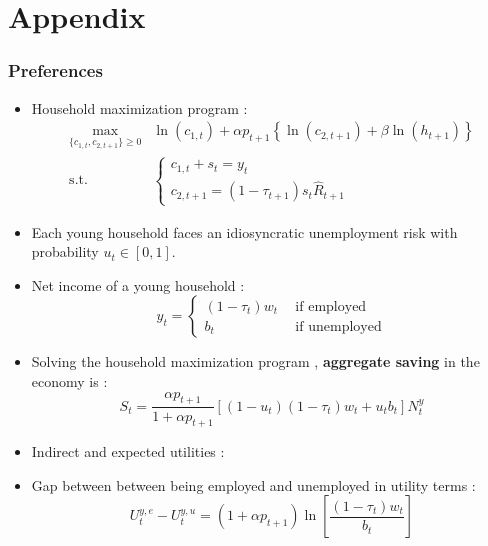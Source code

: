 \documentclass{beamer}
\begin{document}
	\section*{Appendix}
		\begin{frame}[label = preferences]\frametitle{Preferences}
			\begin{itemize}
				\item Household maximization program :
				\begin{align*}
					\max_{\lbrace c_{1,t}, c_{2,t+1} \rbrace \geq 0} &\ln(c_{1,t}) + \alpha p_{t+1}\left\lbrace \ln(c_{2,t+1}) + \beta \ln(h_{t+1}) \right\rbrace\\
					\text{s.t.} ~~ & \begin{cases}
					c_{1,t} + s_t = y_t \\
					c_{2,t+1} = (1-\tau_{t+1}) s_t \hat{R}_{t+1}
					\end{cases}
				\end{align*}
				\item Each young household faces an idiosyncratic unemployment risk with probability $u_t \in \left[0,1\right]$.
				\item Net income of a young household :
				\begin{equation*}
					y_t = \begin{cases}
					(1-\tau_t) w_t ~~ &\text{if employed}\\
					b_t ~~ &\text{if unemployed}
					\end{cases}
				\end{equation*}
			\end{itemize}
			\hyperlink{olgmodel<1>}{}
	\end{frame}
	\begin{frame}[label = utilityresult]
		\begin{itemize}
			\item Solving the household maximization program \hyperlink{focutility<1>}{}, \textbf{aggregate saving} in the economy is :
			\begin{equation*}
				S_t = \frac{\alpha p_{t+1}}{1+\alpha p_{t+1}}\left[ (1-u_t)(1-\tau_t)w_t + u_t b_t \right] N_t^y
			\end{equation*}
			\item Indirect and expected utilities : \hyperlink{indexputility<1>}{}
			\item Gap between between being employed and unemployed in utility terms :
			\begin{equation*}
				U_t^{y,e} - U_t^{y,u} = (1+\alpha p_{t+1})\ln\left[\frac{(1-\tau_t)w_t}{b_t}\right]
			\end{equation*}
		\end{itemize}
		\hyperlink{olgmodel<1>}{}
	\end{frame}
\end{document}
